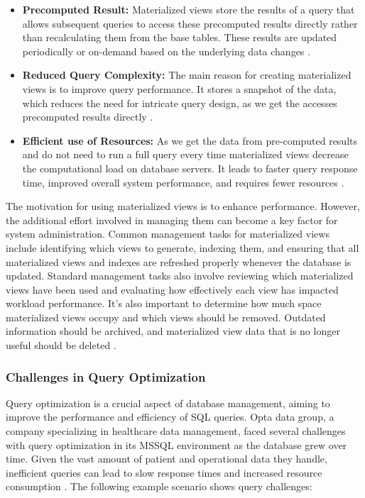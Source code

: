 \begin{itemize}
    \item\textbf{Precomputed Result:} Materialized views store the results of a query that allows subsequent queries to access these precomputed results directly rather than recalculating them from the base tables. These results are updated periodically or on-demand based on the underlying data changes \cite{khan-2023,Risingwave-no-date}.
    
    \item\textbf{Reduced Query Complexity:} The main reason for creating materialized views is to improve query performance. It stores a snapshot of the data, which reduces the need for intricate query design, as we get the accesses precomputed results directly \cite{Risingwave-no-date,Databricks-no-date}.
    
    \item\textbf{Efficient use of Resources:} As we get the data from pre-computed results and do not need to run a full query every time materialized views decrease the computational load on database servers. It leads to faster query response time, improved overall system performance, and requires fewer resources \cite{google-no-date, khan-2023}.
    
\end{itemize}\vspace{.4cm}

The motivation for using materialized views is to enhance performance. However, the additional effort involved in managing them can become a key factor for system administration. Common management tasks for materialized views include identifying which views to generate, indexing them, and ensuring that all materialized views and indexes are refreshed properly whenever the database is updated. Standard management tasks also involve reviewing which materialized views have been used and evaluating how effectively each view has impacted workload performance. It's also important to determine how much space materialized views occupy and which views should be removed. Outdated information should be archived, and materialized view data that is no longer useful should be deleted \cite{Ashadevi2008CostEA,1363763}.\vspace{.4cm}

\subsubsection{Challenges in Query Optimization} Query optimization is a crucial aspect of database management, aiming to improve the performance and efficiency of SQL queries. Opta data group, a company specializing in healthcare data management, faced several challenges with query optimization in its MSSQL environment as the database grew over time. Given the vast amount of patient and operational data they handle, inefficient queries can lead to slow response times and increased resource consumption \cite{Flipico-2024}. The following example scenario shows query challenges:\vspace{.4cm}


